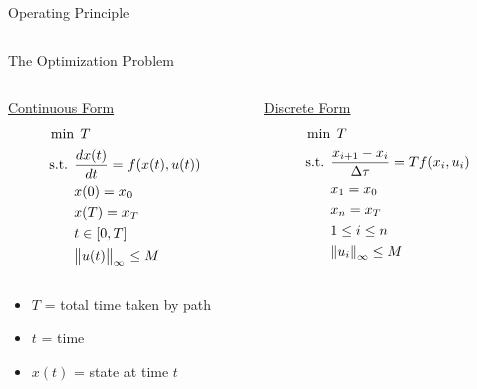 \documentclass[final]{beamer}
\begin{document}
\begin{frame}{}
{\begin{columns}[t]
\begin{column}{.30\linewidth}
\begin{block}{\centering Operating Principle}
\begin{columns}[T]
\end{columns}

\end{block}

                
                

\begin{block}{\centering The Optimization Problem}


\begin{columns}[T]

\begin{column}{10cm}{}

	\underline{Continuous Form}
\begin{align*}
\min  & \: \:T \\
\mbox{s.t. } & \frac{dx(t)}{dt} = f(x(t),u(t)) \\
& x(0) = x_0 \\
& x(T) = x_T \\
& t \in [0, T] \\
& \norm{u(t)}_{\infty} \leq M \\
\end{align*}



\end{column}

\begin{column}{12cm}{}

	\underline{Discrete Form}
\begin{align*}
\min  & \: \:T \\
	\mbox{s.t. } & \frac{x_{i+1}-x_i}{\Delta\tau} = Tf(x_i,u_i) \\
& x_1 = x_0 \\
& x_n = x_T \\
& 1 \leq i \leq n \\
& \norm{u_i}_{\infty} \leq M \\
\end{align*}
\end{column}

\end{columns}


\begin{columns}[T]

\begin{column}{10cm}{}

\begin{itemize}
\item $T$ = total time taken by path 
\item $t$ = time 
\item $x(t)$ = state at time $t$ 
\end{itemize}


\end{column}
\end{columns}
\end{block}
\end{column}
\end{columns}}
\end{frame}
\end{document}
